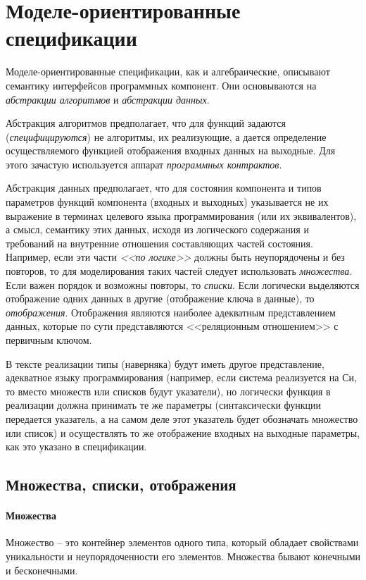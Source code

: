 \documentclass[14pt, twoside]{extreport}
\newcommand{\head}[1]{\vspace{1cm}\subsubsection*{#1}}
\begin{document}
\chapter{Моделе-ориентированные спецификации}

Моделе-ориентированные спецификации, как и алгебраические, описывают семантику интерфейсов программных компонент. Они основываются на \emph{абстракции алгоритмов} и \emph{абстракции данных}.

Абстракция алгоритмов предполагает, что для функций задаются (\emph{специфицируются}) не алгоритмы, их реализующие, а дается определение осуществляемого функцией отображения входных данных на выходные. Для этого зачастую используется аппарат \emph{программных контрактов}.

Абстракция данных предполагает, что для состояния компонента и типов параметров функций компонента (входных и выходных) указывается не их выражение в терминах целевого языка программирования (или их эквивалентов), а смысл, семантику этих данных, исходя из логического содержания и требований на внутренние отношения составляющих частей состояния. Например, если эти части \emph{<<по логике>>} должны быть неупорядочены и без повторов, то для моделирования таких частей следует использовать \emph{множества}. Если важен порядок и возможны повторы, то \emph{списки}. Если логически выделяются отображение одних данных в другие (отображение ключа в данные), то \emph{отображения}. Отображения являются наиболее адекватным представлением данных, которые по сути представляются <<реляционным отношением>> с первичным ключом.

В тексте реализации типы (наверняка) будут иметь другое представление, адекватное языку программирования (например, если система реализуется на Си, то вместо множеств или списков будут указатели), но логически функция в реализации должна принимать те же параметры (синтаксически функции передается указатель, а на самом деле этот указатель будет обозначать множество или список) и осуществлять то же отображение входных на выходные параметры, как это указано в спецификации.

\section{Множества, списки, отображения}

\head{Множества}
Множество -- это контейнер элементов одного типа, который обладает свойствами уникальности и неупорядоченности его элементов. Множества бывают конечными и бесконечными.
\end{document}
